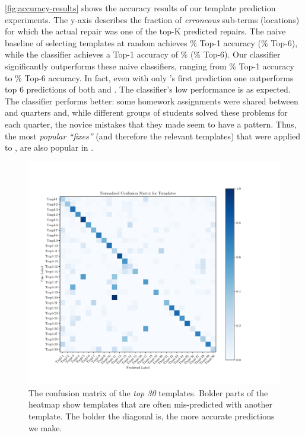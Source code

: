 %
\autoref{fig:accuracy-results} shows the accuracy results of our template
prediction experiments. The y-axis describes the fraction of \emph{erroneous}
sub-terms (locations) for which the actual repair was one of the top-K predicted
repairs.
%
The naive baseline of selecting templates at random achieves
\RandomTopOne\% Top-1 accuracy (\RandomTopSix\% Top-6), while
the \popular classifier achieves a Top-1 accuracy of \PopularTopOne\%
(\PopularTopSix\% Top-6).
%
Our \dnn classifier significantly outperforms these naive
classifiers, ranging from \DnnTopOne\% Top-1 accuracy to
\DnnTopSix\% Top-6 accuracy.
%
In fact, even with only \dnn's first prediction one
outperforms top 6 predictions of both \random and \popular.
%
The \random classifier's low performance is as expected.
%
The \popular classifier performs better: some homework assignments
were shared between \SPRING and \FALL quarters and, while different
groups of students solved these problems for each quarter, the novice
mistakes that they made seem to have a pattern. Thus, the most
\emph{popular ``fixes''} (and therefore the relevant templates)
that were applied to \SPRING, are also popular in \FALL.



\begin{figure}[t]
  \centering
  \includegraphics[trim={30 40 100 70},clip,width=\linewidth]{evaluation-conf-matrix.pdf}
  \caption{The confusion matrix of the \emph{top 30} templates. Bolder parts of
  the heatmap show templates that are often mis-predicted with another template.
  The bolder the diagonal is, the more accurate predictions we make.}
  \label{fig:conf-matrix}
\end{figure}

